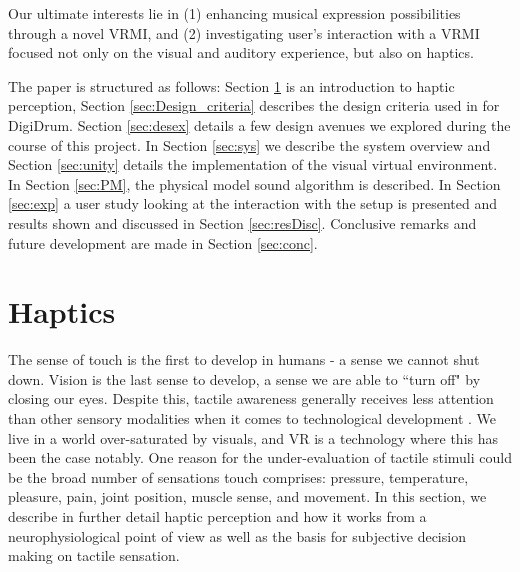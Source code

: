 \documentclass{article}
\begin{document}
Our ultimate interests lie in (1) enhancing musical expression possibilities through a novel VRMI, and (2) investigating user's interaction with a VRMI focused not only on the visual and auditory experience, but also on haptics.


The paper is structured as follows: 
Section \ref{sec:haptics} is an introduction to haptic perception, Section \ref{sec:Design_criteria} describes the design criteria used in for DigiDrum. Section \ref{sec:desex} details a few design avenues we explored during the course of this project. In Section \ref{sec:sys} we describe the system overview and Section \ref{sec:unity} details the implementation of the visual virtual environment. In Section \ref{sec:PM}, the physical model sound algorithm is described. 
In Section \ref{sec:exp} a user study looking at the interaction with the setup is presented and results shown and discussed in Section \ref{sec:resDisc}. Conclusive remarks and future development are made in Section \ref{sec:conc}.


\section{Haptics}\label{sec:haptics}
The sense of touch is the first to develop in humans - a sense we cannot shut down. Vision is the last sense to develop, a sense we are able to ``turn off" \cite{Barnett1972} by closing our eyes. Despite this, tactile awareness generally receives less attention than other sensory modalities when it comes to technological development \cite{Gallace2012}. We live in a world over-saturated by visuals, and VR is a technology where this has been the case notably. One reason for the under-evaluation of tactile stimuli could be the broad number of sensations touch comprises: pressure, temperature, pleasure, pain, joint position, muscle sense, and movement. %
In this section, we describe in further detail haptic perception and how it works from a neurophysiological point of view as well as the basis for subjective decision making on tactile sensation.
\end{document}
